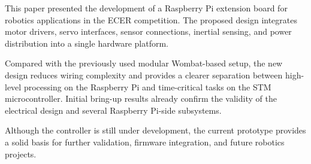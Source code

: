 \documentclass[conference]{IEEEtran}
\begin{document}
	This paper presented the development of a Raspberry Pi extension board for robotics applications in the ECER competition. The proposed design integrates motor drivers, servo interfaces, sensor connections, inertial sensing, and power distribution into a single hardware platform.
	
	Compared with the previously used modular Wombat-based setup, the new design reduces wiring complexity and provides a clearer separation between high-level processing on the Raspberry Pi and time-critical tasks on the STM microcontroller. Initial bring-up results already confirm the validity of the electrical design and several Raspberry Pi-side subsystems.
	
	Although the controller is still under development, the current prototype provides a solid basis for further validation, firmware integration, and future robotics projects.
	\newpage
	
\end{document}
